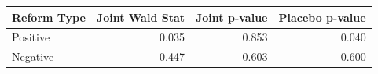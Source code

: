 \begin{tabular}{lrrr}
\toprule
Reform Type & Joint Wald Stat & Joint p-value & Placebo p-value \\
\midrule
Positive & 0.035 & 0.853 & 0.040 \\
Negative & 0.447 & 0.603 & 0.600 \\
\bottomrule
\end{tabular}
